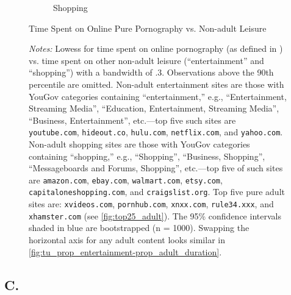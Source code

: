 \documentclass[12pt,twoside]{article}
\begin{document}
\begin{figure}[!h]
\begin{subfigure}[b]{0.495\textwidth}
         \caption{Shopping}
     \end{subfigure}
\caption{Time Spent on Online Pure Pornography vs. Non-adult Leisure}
\caption*{\footnotesize \emph{Notes:}
Lowess for time spent on online pornography (as defined in ) vs. time spent on other non-adult leisure (``entertainment'' and ``shopping'') with a bandwidth of .3.
Observations above the 90th percentile are omitted. Non-adult entertainment sites are those with YouGov categories containing ``entertainment,'' e.g., ``Entertainment, Streaming Media'', ``Education, Entertainment, Streaming Media'', ``Business, Entertainment'', etc.---top five such sites are \texttt{youtube.com}, \texttt{hideout.co}, \texttt{hulu.com}, \texttt{netflix.com}, and \texttt{yahoo.com}. Non-adult shopping sites are those with YouGov categories containing ``shopping,'' e.g., ``Shopping'', ``Business, Shopping'', ``Messageboards and Forums, Shopping'', etc.---top five of such sites are \texttt{amazon.com}, \texttt{ebay.com}, \texttt{walmart.com}, \texttt{etsy.com}, \texttt{capitaloneshopping.com}, and \texttt{craigslist.org}.
Top five pure adult sites are: \texttt{xvideos.com}, \texttt{pornhub.com}, \texttt{xnxx.com}, \texttt{rule34.xxx}, and \texttt{xhamster.com} (see \cref{fig:top25_adult}).
The 95\% confidence intervals shaded in blue are bootstrapped (n = 1000).
Swapping the horizontal axis for any adult content looks similar in \cref{fig:tu_prop_entertainment-prop_adult_duration}. 
}
\end{figure}

\clearpage
\setcounter{table}{0}
\setcounter{figure}{0}
\setcounter{equation}{0}
\FloatBarrier
\renewcommand{\thetable}{C\arabic{table}}
\renewcommand{\thefigure}{C\arabic{figure}}
\renewcommand{\theequation}{C\arabic{equation}}
\subsection{C. \smCTitle{}}\label{sm:smC}
\end{document}
